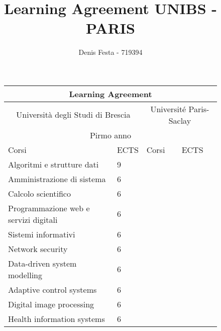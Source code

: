 \documentclass{article}
\title{Learning Agreement UNIBS - PARIS}
\author{Denis Festa - 719394}
\begin{document}
\thispagestyle{empty}

\begin{figure}
    \begin{adjustwidth}{-0.75cm}{}
        \def\arraystretch{1.1}
        \begin{tabular}{|m{5cm}|m{1cm}|m{5cm}|m{1cm}| }
            \hline 
            \multicolumn{4}{|c|}{Learning Agreement} \\
            \hline 
            
            \multicolumn{2}{|c|}{Università degli Studi di Brescia} &
                \multicolumn{2}{c|}{Université Paris-Saclay} \\
            \hline
            
            \multicolumn{4}{|c|}{Pirmo anno} \\
            \hline
            
            Corsi & ECTS & Corsi & ECTS \\
            \hline
            
            Algoritmi e strutture dati & 9 & \multicolumn{2}{c|}{ } \\\cline{1-2}
            Amministrazione di sistema & 6 & \multicolumn{2}{c|}{ } \\\cline{1-2}
            Calcolo scientifico & 6 & \multicolumn{2}{c|}{ } \\\cline{1-2}
            Programmazione web e servizi digitali & 6 & \multicolumn{2}{c|}{ } \\\cline{1-2}
            Sistemi informativi & 6 & \multicolumn{2}{c|}{ } \\\cline{1-2}
            Network security & 6 & \multicolumn{2}{c|}{ } \\\cline{1-2}
            Data-driven system modelling & 6 & \multicolumn{2}{c|}{ } \\\cline{1-2}
            Adaptive control systems & 6 & \multicolumn{2}{c|}{ } \\\cline{1-2}
            Digital image processing & 6 & \multicolumn{2}{c|}{ } \\\cline{1-2}
            Health information systems & 6 & \multicolumn{2}{c|}{ } \\
            \hline
            

\end{tabular}
\end{adjustwidth}
\end{figure}
\end{document}
